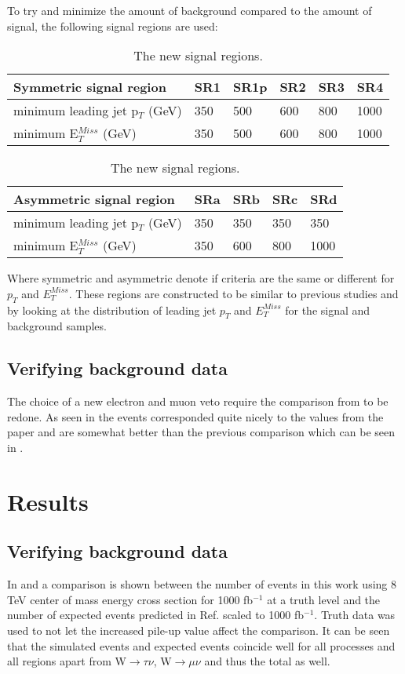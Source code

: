 To try and minimize the amount of background compared to the amount of signal, the following  signal regions are used:
\begin{table}[h]
\renewcommand{\arraystretch}{1.2} %
\begin{center}
\begin{tabular}{l l l l l l}
\hline
Symmetric signal region & SR1 & SR1p & SR2 & SR3 & SR4 \\ \hline
minimum leading jet p$_T$ (GeV) & 350 &500& 600 & 800 & 1000 \\
minimum E$^{Miss}_T$ (GeV) & 350&500 & 600 & 800 & 1000 \\
\end{tabular}
\begin{tabular}{l l l l l} \hline
Asymmetric signal region & SRa &  SRb & SRc & SRd \\ \hline
minimum leading jet p$_T$ (GeV) & 350 & 350 & 350 & 350 \\
minimum E$^{Miss}_T$ (GeV) & 350 & 600 & 800 & 1000 \\ \hline
\end{tabular}
\caption{The new signal regions.}
\label{tab:newsr}
\end{center}
\renewcommand{\arraystretch}{1.0} %
\end{table}

Where symmetric and asymmetric denote if criteria are the same or different for $p_T$  and  $E^{Miss}_T$.
These regions are constructed to be similar to previous studies and by looking at the distribution of leading jet $p_T$  and  $E^{Miss}_T$ for the signal and background samples. 
\subsection{Verifying background data}
The choice of a new electron and muon veto require the comparison from  to be redone. As seen in  the events corresponded quite nicely to the values from the paper and are somewhat better than the previous comparison which can be seen in .

\newpage
\section{Results}\label{chap:sig:sec:res}
\subsection{Verifying background data}\label{Verifying background data}
In  and  a comparison is shown between the number of events in this work using 8 TeV center of mass energy cross section for 1000 fb$^{-1}$ at a truth level and the number of expected events predicted in Ref. \citep{ATLAS-CONF-2012-147} scaled to 1000 fb$^{-1}$. Truth data was used to not let the increased pile-up value affect the comparison. It can be seen that the simulated events and expected events coincide well for all processes and all regions apart from W$\rightarrow\tau\nu$, W$\rightarrow\mu\nu$ and thus the total as well. 

